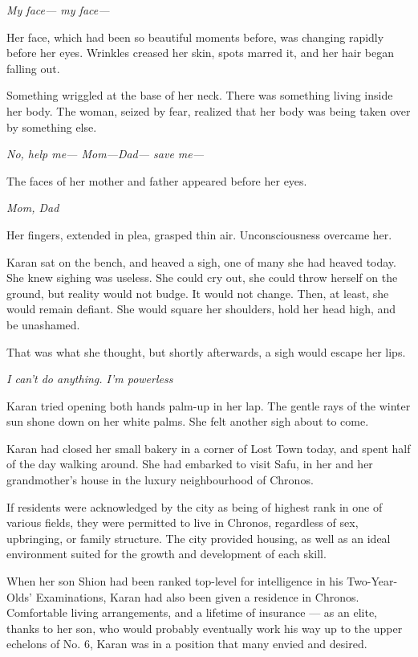 \emph{My face--- my face---}

Her face, which had been so beautiful moments before, was changing
rapidly before her eyes. Wrinkles creased her skin, spots marred it, and
her hair began falling out.

Something wriggled at the base of her neck. There was something living
inside her body. The woman, seized by fear, realized that her body was
being taken over by something else.

\emph{No, help me--- Mom---Dad--- save me---}

The faces of her mother and father appeared before her eyes.

\emph{Mom, Dad\el }

Her fingers, extended in plea, grasped thin air. Unconsciousness
overcame her.

\mybreak

Karan sat on the bench, and heaved a sigh, one of many she had heaved
today. She knew sighing was useless. She could cry out, she could throw
herself on the ground, but reality would not budge. It would not change.
Then, at least, she would remain defiant. She would square her
shoulders, hold her head high, and be unashamed.

That was what she thought, but shortly afterwards, a sigh would escape
her lips.

\emph{I can't do anything. I'm powerless\el }

Karan tried opening both hands palm-up in her lap. The gentle rays of
the winter sun shone down on her white palms. She felt another sigh
about to come.

Karan had closed her small bakery in a corner of Lost Town today, and
spent half of the day walking around. She had embarked to visit Safu, in
her and her grandmother's house in the luxury neighbourhood of Chronos.

If residents were acknowledged by the city as being of highest rank in
one of various fields, they were permitted to live in Chronos,
regardless of sex, upbringing, or family structure. The city provided
housing, as well as an ideal environment suited for the growth and
development of each skill.

When her son Shion had been ranked top-level for intelligence in his
Two-Year-Olds' Examinations, Karan had also been given a residence in
Chronos. Comfortable living arrangements, and a lifetime of insurance ---
as an elite, thanks to her son, who would probably eventually work his
way up to the upper echelons of No. 6, Karan was in a position that many
envied and desired.

